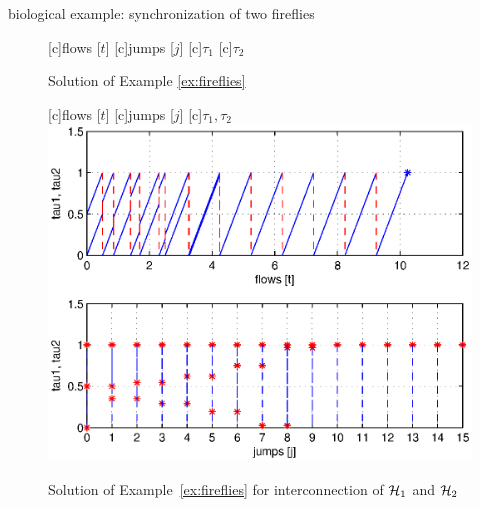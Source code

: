 \begin{example}{biological example: synchronization of two fireflies}

\begin{figure}[ht]
  [c]{flows [$t$]}
  [c]{jumps [$j$]}
  [c]{$\tau_1$}
  [c]{$\tau_2$}
  \centering
{}
\qquad
{}
  \caption{Solution of Example \ref{ex:fireflies}}
\end{figure}

\begin{figure}[ht]
  \begin{center}
  [c]{flows [$t$]}
  [c]{jumps [$j$]}
  [c]{$\tau_1, \tau_2$}
    {\includegraphics[width=.8\textwidth]{figures/Examples/fireflyH1H2.eps}}
   \caption{Solution of Example~\ref{ex:fireflies} for interconnection of $\mathcal{H}_1$ and $\mathcal{H}_2$}
\label{fig:fireflyH1H2}
  \end{center}
\end{figure}



\end{example}
